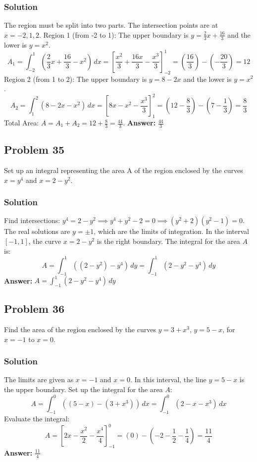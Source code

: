 \documentclass{article}
\begin{document}
\subsubsection*{Solution}
The region must be split into two parts. The intersection points are at $x=-2, 1, 2$.
Region 1 (from -2 to 1): The upper boundary is $y = \frac{2}{3}x + \frac{16}{3}$ and the lower is $y=x^2$.
$$ A_1 = \int_{-2}^{1} \left(\frac{2}{3}x + \frac{16}{3} - x^2\right) \,dx = \left[ \frac{x^2}{3} + \frac{16x}{3} - \frac{x^3}{3} \right]_{-2}^{1} = \left(\frac{16}{3}\right) - \left(-\frac{20}{3}\right) = 12 $$
Region 2 (from 1 to 2): The upper boundary is $y = 8 - 2x$ and the lower is $y=x^2$.
$$ A_2 = \int_{1}^{2} (8 - 2x - x^2) \,dx = \left[ 8x - x^2 - \frac{x^3}{3} \right]_{1}^{2} = \left(12 - \frac{8}{3}\right) - \left(7 - \frac{1}{3}\right) = \frac{8}{3} $$
Total Area: $A = A_1 + A_2 = 12 + \frac{8}{3} = \frac{44}{3}$.
\textbf{Answer:} $ \frac{44}{3} $

\subsection{Problem 35}
Set up an integral representing the area A of the region enclosed by the curves $x = y^4$ and $x = 2 - y^2$.
\subsubsection*{Solution}
Find intersections: $y^4 = 2 - y^2 \implies y^4 + y^2 - 2 = 0 \implies (y^2+2)(y^2-1) = 0$. The real solutions are $y = \pm 1$, which are the limits of integration.
In the interval $[-1, 1]$, the curve $x = 2 - y^2$ is the right boundary. The integral for the area $A$ is:
$$ A = \int_{-1}^{1} ((2 - y^2) - y^4) \,dy = \int_{-1}^{1} (2 - y^2 - y^4) \,dy $$
\textbf{Answer:} $ A = \int_{-1}^{1} (2 - y^2 - y^4) \,dy $

\subsection{Problem 36}
Find the area of the region enclosed by the curves $y = 3 + x^3$, $y = 5 - x$, for $x = -1$ to $x = 0$.
\subsubsection*{Solution}
The limits are given as $x=-1$ and $x=0$. In this interval, the line $y=5-x$ is the upper boundary.
Set up the integral for the area $A$:
$$ A = \int_{-1}^{0} ((5 - x) - (3 + x^3)) \,dx = \int_{-1}^{0} (2 - x - x^3) \,dx $$
Evaluate the integral:
$$ A = \left[ 2x - \frac{x^2}{2} - \frac{x^4}{4} \right]_{-1}^{0} = (0) - \left(-2 - \frac{1}{2} - \frac{1}{4}\right) = \frac{11}{4} $$
\textbf{Answer:} $ \frac{11}{4} $
\end{document}
